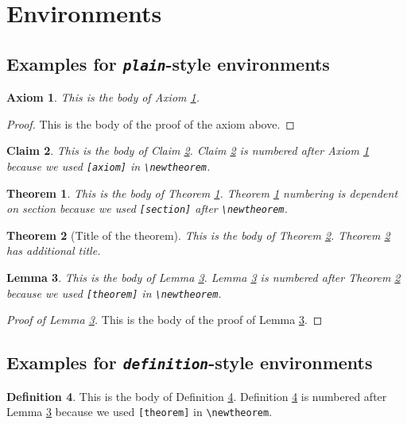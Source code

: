 \documentclass[aoas]{imsart}
\theoremstyle{plain}
\newtheorem{axiom}{Axiom}
\newtheorem{claim}[axiom]{Claim}
\newtheorem{theorem}{Theorem}[section]
\newtheorem{lemma}[theorem]{Lemma}
\theoremstyle{definition}
\newtheorem{definition}[theorem]{Definition}
\begin{document}
\section{Environments}

\subsection{Examples for \emph{\texttt{plain}}-style environments}
\begin{axiom}\label{ax1}
This is the body of Axiom \ref{ax1}.
\end{axiom}

\begin{proof}
This is the body of the proof of the axiom above.
\end{proof}

\begin{claim}\label{cl1}
This is the body of Claim \ref{cl1}. Claim \ref{cl1} is numbered after
Axiom \ref{ax1} because we used \verb|[axiom]| in \verb|\newtheorem|.
\end{claim}

\begin{theorem}\label{th1}
This is the body of Theorem \ref{th1}. Theorem \ref{th1} numbering is
dependent on section because we used \verb|[section]| after \verb|\newtheorem|.
\end{theorem}

\begin{theorem}[Title of the theorem]\label{th2}
This is the body of Theorem \ref{th2}. Theorem \ref{th2} has additional title.
\end{theorem}

\begin{lemma}\label{le1}
This is the body of Lemma \ref{le1}. Lemma \ref{le1} is numbered after
Theorem \ref{th2} because we used \verb|[theorem]| in \verb|\newtheorem|.
\end{lemma}


\begin{proof}[Proof of Lemma \ref{le1}]
This is the body of the proof of Lemma \ref{le1}.
\end{proof}

\subsection{Examples for \emph{\texttt{definition}}-style environments}
\begin{definition}\label{de1}
This is the body of Definition \ref{de1}. Definition \ref{de1} is numbered after
Lemma \ref{le1} because we used \verb|[theorem]| in \verb|\newtheorem|.
\end{definition}
\end{document}
